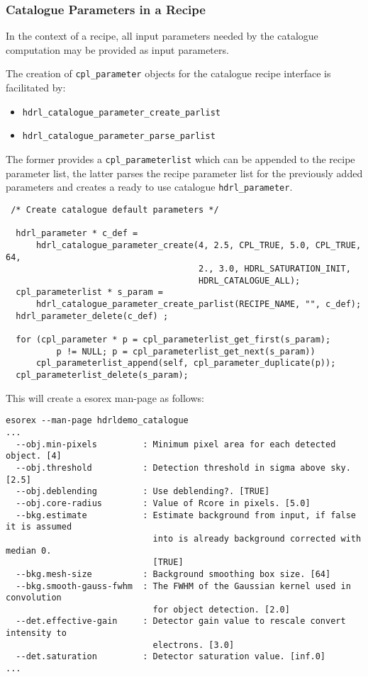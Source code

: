 \subsubsection{Catalogue Parameters in a Recipe}

In the context of a recipe, all input parameters needed by the
catalogue computation may be provided as input parameters.

The creation of \verb+cpl_parameter+ objects for the catalogue recipe interface is
facilitated by:
\begin{itemize}
\item \verb+hdrl_catalogue_parameter_create_parlist+
\item \verb+hdrl_catalogue_parameter_parse_parlist+
\end{itemize}
The former provides a \verb+cpl_parameterlist+ which can be appended
to the recipe parameter list, the latter parses the recipe parameter
list for the previously added parameters and creates a ready to use
catalogue \verb+hdrl_parameter+.

\begin{lstlisting}
 /* Create catalogue default parameters */

  hdrl_parameter * c_def =
      hdrl_catalogue_parameter_create(4, 2.5, CPL_TRUE, 5.0, CPL_TRUE, 64,
                                      2., 3.0, HDRL_SATURATION_INIT, 
                                      HDRL_CATALOGUE_ALL);
  cpl_parameterlist * s_param =
      hdrl_catalogue_parameter_create_parlist(RECIPE_NAME, "", c_def);
  hdrl_parameter_delete(c_def) ;

  for (cpl_parameter * p = cpl_parameterlist_get_first(s_param);
          p != NULL; p = cpl_parameterlist_get_next(s_param))
      cpl_parameterlist_append(self, cpl_parameter_duplicate(p));
  cpl_parameterlist_delete(s_param);
\end{lstlisting}

This will create a esorex man-page as follows:
{\footnotesize
\begin{verbatim}
esorex --man-page hdrldemo_catalogue
...
  --obj.min-pixels         : Minimum pixel area for each detected object. [4]
  --obj.threshold          : Detection threshold in sigma above sky. [2.5]
  --obj.deblending         : Use deblending?. [TRUE]
  --obj.core-radius        : Value of Rcore in pixels. [5.0]
  --bkg.estimate           : Estimate background from input, if false it is assumed
                             into is already background corrected with median 0.
                             [TRUE]
  --bkg.mesh-size          : Background smoothing box size. [64]
  --bkg.smooth-gauss-fwhm  : The FWHM of the Gaussian kernel used in convolution
                             for object detection. [2.0]
  --det.effective-gain     : Detector gain value to rescale convert intensity to
                             electrons. [3.0]
  --det.saturation         : Detector saturation value. [inf.0]
...
\end{verbatim}
}

